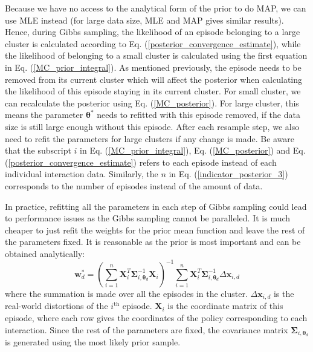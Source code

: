 \documentclass[journal]{IEEEtran}
\begin{document}
Because we have no access to the analytical form of the prior to do MAP, we can use MLE instead (for large data size, MLE and MAP gives similar results).
Hence, during Gibbs sampling, the likelihood of an episode belonging to a large cluster is calculated according to Eq. (\ref{posterior_convergence_estimate}), while the likelihood of belonging to a small cluster is calculated using the first equation in Eq. (\ref{MC_prior_integral}).
As mentioned previously, the episode needs to be removed from its current cluster which will affect the posterior when calculating the likelihood of this episode staying in its current cluster.
For small cluster, we can recalculate the posterior using Eq. (\ref{MC_posterior}).
For large cluster, this means the parameter $\bm{\theta}^*$ needs to refitted with this episode removed, if the data size is still large enough without this episode. 
After each resample step, we also need to refit the parameters for large clusters if any change is made.
Be aware that the subscript $i$ in Eq. (\ref{MC_prior_integral}), Eq. (\ref{MC_posterior}) and Eq. (\ref{posterior_convergence_estimate}) refers to each episode instead of each individual interaction data. 
Similarly, the $n$ in Eq. (\ref{indicator_posterior_3}) corresponds to the number of episodes instead of the amount of data.


In practice, refitting all the parameters in each step of Gibbs sampling could lead to performance issues as the Gibbs sampling cannot be paralleled.
It is much cheaper to just refit the weights for the prior mean function and leave the rest of the parameters fixed.
It is reasonable as the prior is most important and can be obtained analytically:
\begin{equation}
\bm{w}_d^* = \left(\sum_{i=1}^n
\bm{X}_i^T \bm{\Sigma}_{i, \bm{\theta}_d}^{-1} \bm{X}_i
\right)^{-1} \sum_{i=1}^n \bm{X}^T_i \bm{\Sigma}_{i, \bm{\theta}_d}^{-1} \Delta \bm{x}_{i, d}
\label{refitted_weights}
\end{equation}
where the summation is made over all the episodes in the cluster.
$\Delta \bm{x}_{i, d}$ is the real-world distortions of the $i^{\text{th}}$ episode.
$\bm{X}_i$ is the coordinate matrix of this episode, where each row gives the coordinates of the policy corresponding to each interaction.
Since the rest of the parameters are fixed, the covariance matrix $\bm{\Sigma}_{i, \bm{\theta}_d}$ is generated using the most likely prior sample.
\end{document}
